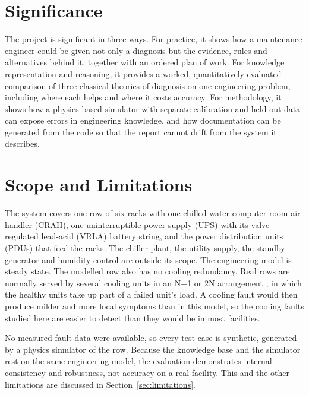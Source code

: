 \section{Significance}
\label{sec:significance}

The project is significant in three ways. For practice, it shows how a maintenance engineer could be given not only a diagnosis but the evidence, rules and alternatives behind it, together with an ordered plan of work. For knowledge representation and reasoning, it provides a worked, quantitatively evaluated comparison of three classical theories of diagnosis on one engineering problem, including where each helps and where it costs accuracy. For methodology, it shows how a physics-based simulator with separate calibration and held-out data can expose errors in engineering knowledge, and how documentation can be generated from the code so that the report cannot drift from the system it describes.

\section{Scope and Limitations}
\label{sec:scope}

The system covers one row of six racks with one chilled-water computer-room air handler (CRAH), one uninterruptible power supply (UPS) with its valve-regulated lead-acid (VRLA) battery string, and the power distribution units (PDUs) that feed the racks. The chiller plant, the utility supply, the standby generator and humidity control are outside its scope. The engineering model is steady state. The modelled row also has no cooling redundancy. Real rows are normally served by several cooling units in an N+1 or 2N arrangement \parencite{barroso2018}, in which the healthy units take up part of a failed unit's load. A cooling fault would then produce milder and more local symptoms than in this model, so the cooling faults studied here are easier to detect than they would be in most facilities.

No measured fault data were available, so every test case is synthetic, generated by a physics simulator of the row. Because the knowledge base and the simulator rest on the same engineering model, the evaluation demonstrates internal consistency and robustness, not accuracy on a real facility. This and the other limitations are discussed in Section~\ref{sec:limitations}.

